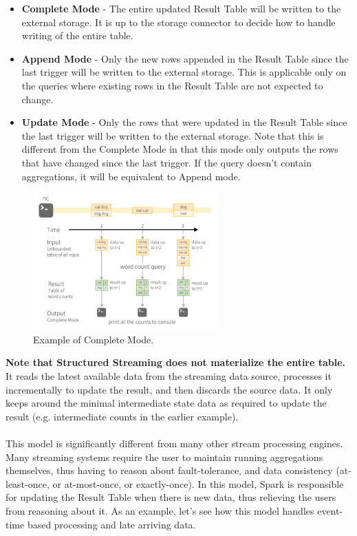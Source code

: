 \documentclass[10pt,a4paper]{article}
\newcommand{\nline}{\\~\\}
\begin{document}
 \begin{itemize}
 	\item \textbf{Complete Mode} - The entire updated Result Table will be written to the external storage. It is up to the storage connector to decide how to handle writing of the entire table.
	\item \textbf{Append Mode} - Only the new rows appended in the Result Table since the last trigger will be written to the external storage. This is applicable only on the queries where existing rows in the Result Table are not expected to change.
	\item \textbf{Update Mode} - Only the rows that were updated in the Result Table since the last trigger will be written to the external storage. Note that this is different from the Complete Mode in that this mode only outputs the rows that have changed since the last trigger. If the query doesn’t contain aggregations, it will be equivalent to Append mode.
 \end{itemize}
     \begin{figure}[ht!]
 \hfill \includegraphics[width=200pt]{images/spark-mode-ex}
 \hspace*{\fill}
 \caption{Example of Complete Mode.}
 \end{figure} 
 \textbf{Note that Structured Streaming does not materialize the entire table.} It reads the latest available data from the streaming data source, processes it incrementally to update the result, and then discards the source data. It only keeps around the minimal intermediate state data as required to update the result (e.g. intermediate counts in the earlier example). \nline
 This model is significantly different from many other stream processing engines. Many streaming systems require the user to maintain running aggregations themselves, thus having to reason about fault-tolerance, and data consistency (at-least-once, or at-most-once, or exactly-once). In this model, Spark is responsible for updating the Result Table when there is new data, thus relieving the users from reasoning about it. As an example, let’s see how this model handles event-time based processing and late arriving data.
\end{document}
